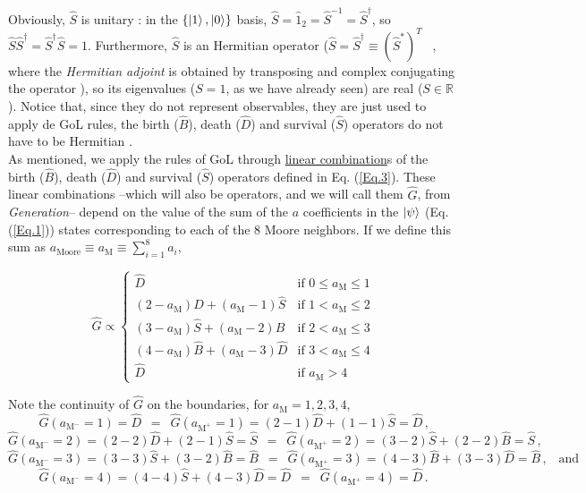 \documentclass[11pt]{article}
\numberwithin{equation}{section} %
\numberwithin{figure}{section} %
\begin{document}
\vspace{0.5cm}

Obviously, $\hat{S}$ is unitary \cite[p.~36, Eq.~(1.5.2)]{Sakurai}: in the $\{\ket{1},\ket{0}\}$ basis, $\hat{S}=\hat{1}_2=\hat{S}^{-1}=\hat{S}^\dagger$, so $\hat{S}\hat{S}^\dagger=\hat{S}^\dagger\hat{S}=1$. Furthermore, $\hat{S}$ is an Hermitian operator ($\hat{S}=\hat{S}^\dagger\equiv(\hat{S}^*)^T\,\,\,$ \cite[p.~15, Eq.~(1.2.25)]{Sakurai}, where the \emph{Hermitian adjoint} is obtained by transposing and complex conjugating the operator \cite[p.~18, l.~28]{Nielsen}), so its eigenvalues ($S=1$, as we have already seen) are real ($S\in\mathbb{R}$). Notice that, since they do not represent observables, they are just used to apply de GoL rules, the birth ($\hat{B}$), death ($\hat{D}$) and survival ($\hat{S}$) operators do not have to be Hermitian \cite[p.~97, Eq.~(3.18)]{Griffiths}.\\

As mentioned, we apply the rules of GoL through \uline{linear combination}s of the birth ($\hat{B}$), death ($\hat{D}$) and survival ($\hat{S}$) operators defined in Eq. (\ref{Eq.3}). These linear combinations --which will also be operators, and we will call them $\hat{G}$, from \emph{Generation}-- depend on the value of the sum of the $a$ coefficients in the $\ket{\psi}$ (Eq. (\ref{Eq.1})) states corresponding to each of the 8 Moore neighbors. If we define this sum as $a_{\textrm{Moore}}\equiv a_{\textrm{M}}\equiv\sum_{i=1}^8 a_i$, $\,\,\,$ \cite[p.~2, Eq.~(7)]{Flitney}

\begin{equation} \label{G_operator}
  \hat{G}\propto
  \begin{cases}
 \hat{D}         & \text{if $0\leq a_{\textrm{M}}\leq 1$} \\
 (2-a_{\textrm{M}})\hat{D}+(a_{\textrm{M}}-1)\hat{S}         & \text{if $1< a_{\textrm{M}}\leq 2$} \\
 (3-a_{\textrm{M}})\hat{S}+(a_{\textrm{M}}-2)\hat{B}         & \text{if $2< a_{\textrm{M}}\leq 3$} \\
 (4-a_{\textrm{M}})\hat{B}+(a_{\textrm{M}}-3)\hat{D}         & \text{if $3< a_{\textrm{M}}\leq 4$} \\
 \hat{D}         & \text{if $a_{\textrm{M}}> 4$}
  \end{cases}
\end{equation}

\vspace{0.5cm}

Note the continuity of $\hat{G}$ on the boundaries, for $a_{\textrm{M}}=1,2,3,4$,
$$\hat{G}(a_{\textrm{M}^-}=1)=\hat{D}\,\,\,=\,\,\,\hat{G}(a_{\textrm{M}^+}=1)=(2-1)\hat{D}+(1-1)\hat{S}=\hat{D}\,\textrm{,}$$
$$\hat{G}(a_{\textrm{M}^-}=2)=(2-2)\hat{D}+(2-1)\hat{S}=\hat{S}\,\,\,=\,\,\,\hat{G}(a_{\textrm{M}^+}=2)=(3-2)\hat{S}+(2-2)\hat{B}=\hat{S}\,\textrm{,}$$
$$\hat{G}(a_{\textrm{M}^-}=3)=(3-3)\hat{S}+(3-2)\hat{B}=\hat{B}\,\,\,=\,\,\,\hat{G}(a_{\textrm{M}^+}=3)=(4-3)\hat{B}+(3-3)\hat{D}=\hat{B}\,\textrm{,}\quad\textrm{and}$$
$$\hat{G}(a_{\textrm{M}^-}=4)=(4-4)\hat{S}+(4-3)\hat{D}=\hat{D}\,\,\,=\,\,\,\hat{G}(a_{\textrm{M}^+}=4)=\hat{D}\,\textrm{.}$$
\end{document}
